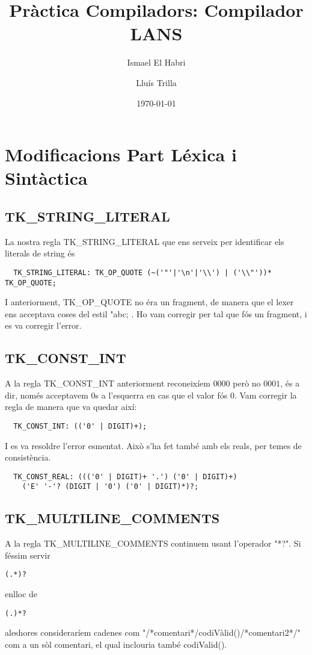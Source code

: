 \documentclass[11pt,a4paper,twoside]{article}
\title{Pràctica Compiladors: Compilador LANS}
\author{Ismael El Habri
	\and 
	Lluís Trilla
	}
\date{\today}
\begin{document}
\maketitle

\section{Modificacions Part Léxica i Sintàctica}

\subsection{TK\_STRING\_LITERAL}

La nostra regla TK\_STRING\_LITERAL que ens serveix per identificar els literals de string és
\begin{lstlisting}
  TK_STRING_LITERAL: TK_OP_QUOTE (~('"'|'\n'|'\\') | ('\\"'))* TK_OP_QUOTE;
\end{lstlisting}
I anteriorment, TK\_OP\_QUOTE no éra un fragment, de manera que el lexer ens acceptava coses del estil "abc; . Ho vam corregir per tal que fós un fragment, i es va corregir l'error.

\subsection{TK\_CONST\_INT}
A la regla TK\_CONST\_INT anteriorment reconeixíem $0000$ però no $0001$, és a dir, només acceptavem 0s a l'esquerra en cas que el valor fós 0. Vam corregir la regla de manera que va quedar així:
\begin{lstlisting}
  TK_CONST_INT: (('0' | DIGIT)+);
\end{lstlisting}
I es va resoldre l'error esmentat. Això s'ha fet també amb els reals, per temes de consistència.
\begin{lstlisting}
  TK_CONST_REAL: ((('0' | DIGIT)+ '.') ('0' | DIGIT)+) 
    ('E' '-'? (DIGIT | '0') ('0' | DIGIT)*)?;
\end{lstlisting}

\subsection{TK\_MULTILINE\_COMMENTS}
A la regla TK\_MULTILINE\_COMMENTS continuem usant l'operador "*?". Si féssim servir
\begin{lstlisting}
(.*)?
\end{lstlisting}
  enlloc de
\begin{lstlisting}
(.)*?
\end{lstlisting}
    aleshores consideraríem cadenes com "/*comentari*/codiVàlid()/*comentari2*/"$ $
    com a un sòl comentari, el qual inclouria també codiValid().
\end{document}
